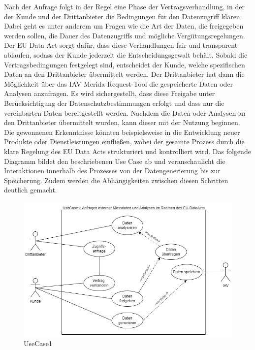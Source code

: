 Nach der Anfrage folgt in der Regel eine Phase der Vertragsverhandlung, in der der Kunde und der Drittanbieter die Bedingungen für den Datenzugriff klären. Dabei geht es unter anderem um Fragen wie die Art der Daten, die freigegeben werden sollen, die Dauer des Datenzugriffs und mögliche Vergütungsregelungen. Der EU Data Act sorgt dafür, dass diese Verhandlungen fair und transparent ablaufen, sodass der Kunde jederzeit die Entscheidungsgewalt behält.
\newline
Sobald die Vertragsbedingungen festgelegt sind, entscheidet der Kunde, welche spezifischen Daten an den Drittanbieter übermittelt werden. Der Drittanbieter hat dann die Möglichkeit über das IAV Merida Request-Tool die gespeicherte Daten oder Analysen anzufragen. Es wird sichergestellt, dass diese Freigabe unter Berücksichtigung der Datenschutzbestimmungen erfolgt und dass nur die vereinbarten Daten bereitgestellt werden.
\newline
Nachdem die Daten oder Analysen an den Drittanbieter übermittelt wurden, kann dieser mit der Nutzung beginnen. Die gewonnenen Erkenntnisse könnten beispielsweise in die Entwicklung neuer Produkte oder Dienstleistungen einfließen, wobei der gesamte Prozess durch die klare Regelung des EU Data Acts strukturiert und kontrolliert wird.
\newline
Das folgende Diagramm bildet den beschriebenen Use Case ab und veranschaulicht die Interaktionen innerhalb des Prozesses von der Datengenerierung bis zur Speicherung. Zudem werden die Abhängigkeiten zwischen diesen Schritten deutlich gemacht.
\begin{figure}[H]
    \centering
    \includegraphics[scale=.6]{media/UseCase1}
    \caption{UseCase1}
    \label{fig:UseCase1}
\end{figure}
\newpage
